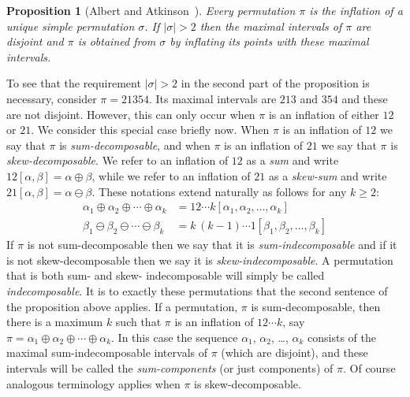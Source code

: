 \documentclass[10pt]{article}
\theoremstyle{plain}
\newtheorem{proposition}[theorem]{Proposition}
\begin{document}
\begin{proposition}[Albert and Atkinson~\cite{albert:simple-permutations}]
\label{prop-unique-skeleton}
	Every permutation $\pi$ is the inflation of a unique simple permutation $\sigma$.  If $|\sigma|>2$ then the maximal intervals of $\pi$ are disjoint and $\pi$ is obtained from $\sigma$ by inflating its points with these maximal intervals.
\end{proposition}

To see that the requirement $|\sigma| > 2$ in the second part of the proposition is necessary, consider $\pi = 21354$. Its maximal intervals are $213$ and $354$ and these are not disjoint. However, this can only occur when $\pi$ is an inflation of either $12$ or $21$. We consider this special case briefly now. When $\pi$ is an inflation of $12$ we say that $\pi$ is \emph{sum-decomposable}, and when $\pi$ is an inflation of $21$ we say that $\pi$ is \emph{skew-decomposable}. We refer to an inflation of $12$ as a \emph{sum} and write $12[\alpha, \beta] = \alpha \oplus \beta$, while we refer  to an inflation of $21$ as a \emph{skew-sum} and write $21[\alpha, \beta] = \alpha \ominus \beta$. These notations extend naturally as follows for any $k \geq 2$:
\begin{align*}
\alpha_1 \oplus \alpha_2 \oplus \cdots \oplus \alpha_k &= 12 \cdots k [\alpha_1, \alpha_2, \ldots, \alpha_k] \\
\beta_1 \ominus \beta_2 \ominus \cdots \ominus \beta_k &= k \, (k-1)  \cdots 1 [\beta_1, \beta_2, \ldots, \beta_k] 
\end{align*}
If $\pi$ is not sum-decomposable then we say that it is \emph{sum-indecomposable} and if it is not skew-decomposable then we say it is \emph{skew-indecomposable}. A permutation that is both sum- and skew- indecomposable will simply be called \emph{indecomposable}. It is to exactly these permutations that the second sentence of the proposition above applies. If a permutation, $\pi$ is sum-decomposable, then there is a maximum $k$ such that $\pi$ is an inflation of $12 \cdots k$, say $\pi =  \alpha_1 \oplus \alpha_2 \oplus \cdots \oplus \alpha_k$. In this case the sequence $\alpha_1$, $\alpha_2$, \dots, $\alpha_k$ consists of the maximal sum-indecomposable intervals of $\pi$ (which are disjoint), and these intervals will be called the \emph{sum-components} (or just components) of $\pi$. Of course analogous terminology applies when $\pi$ is skew-decomposable.

\end{document}

